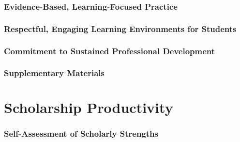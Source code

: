\documentclass[11pt,titlepage]{article}
\begin{document}
\section{Evidence-Based, Learning-Focused Practice}  %


\section{Respectful, Engaging Learning Environments for Students}  %


\section{Commitment to Sustained Professional Development}  %


\section{Supplementary Materials}  %

\begin{supplements}[
    directory=../../,
    type=\LaTeXe{} packages,
]
\end{supplements}


\part{Scholarship Productivity}\label{section:scholarship}

\section{Self-Assessment of Scholarly Strengths}


\end{document}
